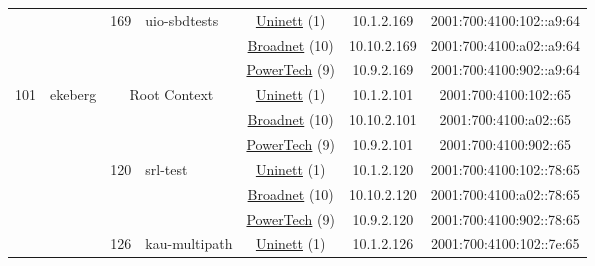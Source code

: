\begin{small}
\begin{center}
\begin{longtable}{|c|c|c|c|c|c|c|c|}
  &  & \multirow{3}{*}{\tiny{169}} & \multicolumn{1}{|l|}{\multirow{3}{*}{\tiny{uio-sbdtests}}} & \multicolumn{2}{|c|}{\tiny{\href{https://www.uninett.no}{Uninett} (1)}} & \tiny{10.1.2.169} & \tiny{2001:700:4100:102::a9:64} \\* \cline{5-5}\cline{6-6}\cline{7-7}\cline{8-8}
  &  &  &  & \multicolumn{2}{|c|}{\tiny{\href{https://www.broadnet.no}{Broadnet} (10)}} & \tiny{10.10.2.169} & \tiny{2001:700:4100:a02::a9:64} \\* \cline{5-5}\cline{6-6}\cline{7-7}\cline{8-8}
  &  &  &  & \multicolumn{2}{|c|}{\tiny{\href{http://www.powertech.no}{PowerTech} (9)}} & \tiny{10.9.2.169} & \tiny{2001:700:4100:902::a9:64} \\ \hline
 \multirow{27}{*}{\tiny{101}} & \multicolumn{1}{|l|}{\multirow{27}{*}{\tiny{ekeberg}}} & \multicolumn{2}{|c|}{\multirow{3}{*}{\tiny{Root Context}}} & \multicolumn{2}{|c|}{\tiny{\href{https://www.uninett.no}{Uninett} (1)}} & \tiny{10.1.2.101} & \tiny{2001:700:4100:102::65} \\* \cline{5-5}\cline{6-6}\cline{7-7}\cline{8-8}
  &  & \multicolumn{2}{|c|}{} & \multicolumn{2}{|c|}{\tiny{\href{https://www.broadnet.no}{Broadnet} (10)}} & \tiny{10.10.2.101} & \tiny{2001:700:4100:a02::65} \\* \cline{5-5}\cline{6-6}\cline{7-7}\cline{8-8}
  &  & \multicolumn{2}{|c|}{} & \multicolumn{2}{|c|}{\tiny{\href{http://www.powertech.no}{PowerTech} (9)}} & \tiny{10.9.2.101} & \tiny{2001:700:4100:902::65} \\* \cline{3-3}\cline{4-4}\cline{5-5}\cline{6-6}\cline{7-7}\cline{8-8}
  &  & \multirow{3}{*}{\tiny{120}} & \multicolumn{1}{|l|}{\multirow{3}{*}{\tiny{srl-test}}} & \multicolumn{2}{|c|}{\tiny{\href{https://www.uninett.no}{Uninett} (1)}} & \tiny{10.1.2.120} & \tiny{2001:700:4100:102::78:65} \\* \cline{5-5}\cline{6-6}\cline{7-7}\cline{8-8}
  &  &  &  & \multicolumn{2}{|c|}{\tiny{\href{https://www.broadnet.no}{Broadnet} (10)}} & \tiny{10.10.2.120} & \tiny{2001:700:4100:a02::78:65} \\* \cline{5-5}\cline{6-6}\cline{7-7}\cline{8-8}
  &  &  &  & \multicolumn{2}{|c|}{\tiny{\href{http://www.powertech.no}{PowerTech} (9)}} & \tiny{10.9.2.120} & \tiny{2001:700:4100:902::78:65} \\* \cline{3-3}\cline{4-4}\cline{5-5}\cline{6-6}\cline{7-7}\cline{8-8}
  &  & \multirow{3}{*}{\tiny{126}} & \multicolumn{1}{|l|}{\multirow{3}{*}{\tiny{kau-multipath}}} & \multicolumn{2}{|c|}{\tiny{\href{https://www.uninett.no}{Uninett} (1)}} & \tiny{10.1.2.126} & \tiny{2001:700:4100:102::7e:65} \\* \cline{5-5}\cline{6-6}\cline{7-7}\cline{8-8}

\end{longtable}
\end{center}
\end{small}
